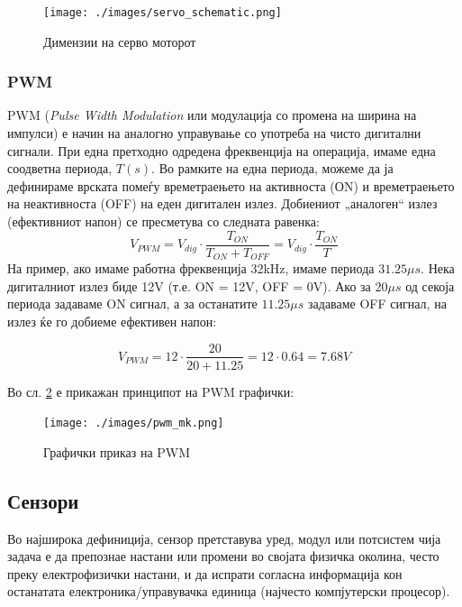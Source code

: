\documentclass[11pt]{article}
\begin{document}
		  \begin{figure}[H]
        \texttt{[image: ./images/servo\_schematic.png]}
        \centering
        \caption{Димензии на серво моторот}
        \label{fig:servo_schematic.png}
        \end{figure}

    \subsubsection{PWM} \label{sec:pwm}
    	PWM (\textit{Pulse Width Modulation} или модулација со промена на ширина на импулси) е начин на аналогно управување со употреба на чисто дигитални сигнали. При една претходно одредена фреквенција на операција, имаме една соодветна периода, $T(s)$. Во рамките на една периода, можеме да ја дефинираме врската помеѓу времетраењето на активноста (ОN) и времетраењето на неактивноста (OFF) на еден дигитален излез. Добиениот „аналоген“ излез (ефективниот напон) се пресметува со следната равенка:\\
      \begin{equation}
        V_{PWM} = V_{dig} \cdot \frac{T_{ON}}{T_{ON} + T_{OFF}} = V_{dig} \cdot \frac{T_{ON}}{T}
      \end{equation}
      На пример, ако имаме работна фреквенција 32kHz, имаме периода $31.25\mu s$. Нека дигиталниот излез биде 12V (т.е. ON = 12V, OFF = 0V). Ако за $20\mu s$ од секоја периода задаваме ON сигнал, а за останатите $11.25\mu s$ задаваме OFF сигнал, на излез ќе го добиеме ефективен напон:

      $$ V_{PWM} = 12 \cdot \frac{20}{20+11.25} = 12 \cdot 0.64 = 7.68V $$

      Во сл. \ref{fig:pwm} е прикажан принципот на PWM графички:
      \begin{figure}[H]
        \centering
        \texttt{[image: ./images/pwm\_mk.png]}
        \caption{Графички приказ на PWM}
        \label{fig:pwm}
      \end{figure}

  \subsection{Сензори}
    Во најширока дефиниција, сензор претставува уред, модул или потсистем чија задача е да препознае настани или промени во својата физичка околина, често преку електрофизички настани, и да испрати согласна информација кон останатата електроника/управувачка единица (најчесто компјутерски процесор).
\end{document}
